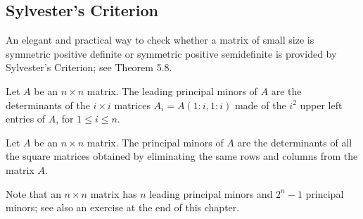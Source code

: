 
\subsection{Sylvester's Criterion}

An elegant and practical way to check whether a matrix of small size is symmetric
positive definite or symmetric positive semidefinite is provided by Sylvester's
Criterion; see Theorem 5.8.

\begin{definition}
Let $A$ be an $n \times n$ matrix. The leading principal minors of $A$ are the
determinants of the $i \times i$ matrices $A_i = A(1:i,1:i)$ made of the $i^2$ upper
left entries of $A$, for $1 \leq i \leq n$.
\end{definition}

\begin{definition}
Let $A$ be an $n \times n$ matrix. The principal minors of $A$ are the determinants of
all the square matrices obtained by eliminating the same rows and columns from the
matrix $A$.
\end{definition}

Note that an $n \times n$ matrix has $n$ leading principal minors and $2^n-1$ principal
minors; see also an exercise at the end of this chapter.

